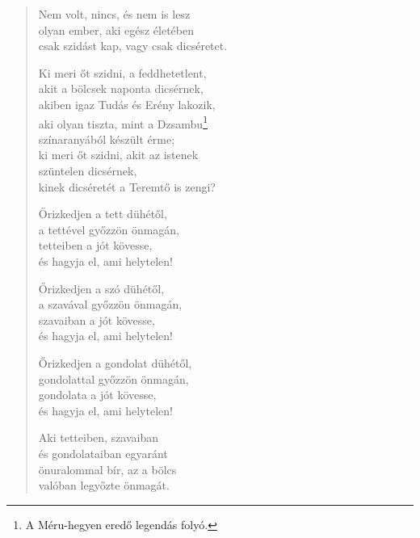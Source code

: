\begin{verse}
 Nem volt, nincs, és nem is lesz\\
olyan ember, aki egész életében\\
csak szidást kap, vagy csak dicséretet.

 Ki meri őt szidni, a feddhetetlent,\\
akit a bölcsek naponta dicsérnek,\\
akiben igaz Tudás és Erény lakozik,\\
aki olyan tiszta, mint a Dzsambu\footnote{A Méru-hegyen eredő legendás folyó.}\\
színaranyából készült érme;\\
ki meri őt szidni, akit az istenek\\
szüntelen dicsérnek,\\
kinek dicséretét a Teremtő is zengi?

 Őrizkedjen a tett dühétől,\\
a tettével győzzön önmagán,\\
tetteiben a jót kövesse,\\
és hagyja el, ami helytelen!

 Őrizkedjen a szó dühétől,\\
a szavával győzzön önmagán,\\
szavaiban a jót kövesse,\\
és hagyja el, ami helytelen!

 Őrizkedjen a gondolat dühétől,\\
gondolattal győzzön önmagán,\\
gondolata a jót kövesse,\\
és hagyja el, ami helytelen!

 Aki tetteiben, szavaiban\\
és gondolataiban egyaránt\\
önuralommal bír, az a bölcs\\
valóban legyőzte önmagát.

\end{verse}

